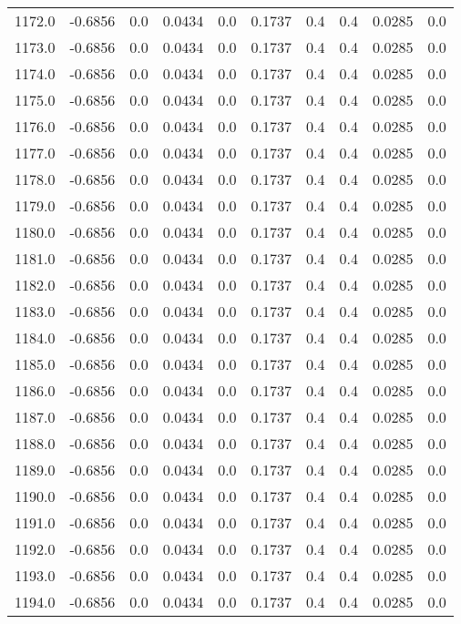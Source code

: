 \begin{longtable}{lrrrrrrrrr}
1172.0 & -0.6856 & 0.0 & 0.0434 & 0.0 & 0.1737 & 0.4 & 0.4 & 0.0285 & 0.0 \\
1173.0 & -0.6856 & 0.0 & 0.0434 & 0.0 & 0.1737 & 0.4 & 0.4 & 0.0285 & 0.0 \\
1174.0 & -0.6856 & 0.0 & 0.0434 & 0.0 & 0.1737 & 0.4 & 0.4 & 0.0285 & 0.0 \\
1175.0 & -0.6856 & 0.0 & 0.0434 & 0.0 & 0.1737 & 0.4 & 0.4 & 0.0285 & 0.0 \\
1176.0 & -0.6856 & 0.0 & 0.0434 & 0.0 & 0.1737 & 0.4 & 0.4 & 0.0285 & 0.0 \\
1177.0 & -0.6856 & 0.0 & 0.0434 & 0.0 & 0.1737 & 0.4 & 0.4 & 0.0285 & 0.0 \\
1178.0 & -0.6856 & 0.0 & 0.0434 & 0.0 & 0.1737 & 0.4 & 0.4 & 0.0285 & 0.0 \\
1179.0 & -0.6856 & 0.0 & 0.0434 & 0.0 & 0.1737 & 0.4 & 0.4 & 0.0285 & 0.0 \\
1180.0 & -0.6856 & 0.0 & 0.0434 & 0.0 & 0.1737 & 0.4 & 0.4 & 0.0285 & 0.0 \\
1181.0 & -0.6856 & 0.0 & 0.0434 & 0.0 & 0.1737 & 0.4 & 0.4 & 0.0285 & 0.0 \\
1182.0 & -0.6856 & 0.0 & 0.0434 & 0.0 & 0.1737 & 0.4 & 0.4 & 0.0285 & 0.0 \\
1183.0 & -0.6856 & 0.0 & 0.0434 & 0.0 & 0.1737 & 0.4 & 0.4 & 0.0285 & 0.0 \\
1184.0 & -0.6856 & 0.0 & 0.0434 & 0.0 & 0.1737 & 0.4 & 0.4 & 0.0285 & 0.0 \\
1185.0 & -0.6856 & 0.0 & 0.0434 & 0.0 & 0.1737 & 0.4 & 0.4 & 0.0285 & 0.0 \\
1186.0 & -0.6856 & 0.0 & 0.0434 & 0.0 & 0.1737 & 0.4 & 0.4 & 0.0285 & 0.0 \\
1187.0 & -0.6856 & 0.0 & 0.0434 & 0.0 & 0.1737 & 0.4 & 0.4 & 0.0285 & 0.0 \\
1188.0 & -0.6856 & 0.0 & 0.0434 & 0.0 & 0.1737 & 0.4 & 0.4 & 0.0285 & 0.0 \\
1189.0 & -0.6856 & 0.0 & 0.0434 & 0.0 & 0.1737 & 0.4 & 0.4 & 0.0285 & 0.0 \\
1190.0 & -0.6856 & 0.0 & 0.0434 & 0.0 & 0.1737 & 0.4 & 0.4 & 0.0285 & 0.0 \\
1191.0 & -0.6856 & 0.0 & 0.0434 & 0.0 & 0.1737 & 0.4 & 0.4 & 0.0285 & 0.0 \\
1192.0 & -0.6856 & 0.0 & 0.0434 & 0.0 & 0.1737 & 0.4 & 0.4 & 0.0285 & 0.0 \\
1193.0 & -0.6856 & 0.0 & 0.0434 & 0.0 & 0.1737 & 0.4 & 0.4 & 0.0285 & 0.0 \\
1194.0 & -0.6856 & 0.0 & 0.0434 & 0.0 & 0.1737 & 0.4 & 0.4 & 0.0285 & 0.0 \\

\end{longtable}
